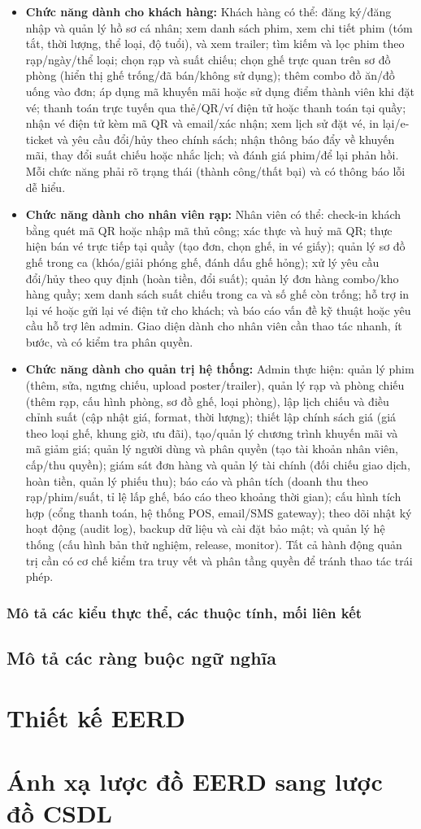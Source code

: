 \documentclass[a4paper]{article}
\begin{document}
\begin{itemize}
	\item \textbf{Chức năng dành cho khách hàng:} Khách hàng có thể: đăng ký/đăng nhập và quản lý hồ sơ cá nhân; xem danh sách phim, xem chi tiết phim (tóm tắt, thời lượng, thể loại, độ tuổi), và xem trailer; tìm kiếm và lọc phim theo rạp/ngày/thể loại; chọn rạp và suất chiếu; chọn ghế trực quan trên sơ đồ phòng (hiển thị ghế trống/đã bán/không sử dụng); thêm combo đồ ăn/đồ uống vào đơn; áp dụng mã khuyến mãi hoặc sử dụng điểm thành viên khi đặt vé; thanh toán trực tuyến qua thẻ/QR/ví điện tử hoặc thanh toán tại quầy; nhận vé điện tử kèm mã QR và email/xác nhận; xem lịch sử đặt vé, in lại/e-ticket và yêu cầu đổi/hủy theo chính sách; nhận thông báo đẩy về khuyến mãi, thay đổi suất chiếu hoặc nhắc lịch; và đánh giá phim/để lại phản hồi. Mỗi chức năng phải rõ trạng thái (thành công/thất bại) và có thông báo lỗi dễ hiểu.
	\item \textbf{Chức năng dành cho nhân viên rạp:} Nhân viên có thể: check-in khách bằng quét mã QR hoặc nhập mã thủ công; xác thực và huỷ mã QR; thực hiện bán vé trực tiếp tại quầy (tạo đơn, chọn ghế, in vé giấy); quản lý sơ đồ ghế trong ca (khóa/giải phóng ghế, đánh dấu ghế hỏng); xử lý yêu cầu đổi/hủy theo quy định (hoàn tiền, đổi suất); quản lý đơn hàng combo/kho hàng quầy; xem danh sách suất chiếu trong ca và số ghế còn trống; hỗ trợ in lại vé hoặc gửi lại vé điện tử cho khách; và báo cáo vấn đề kỹ thuật hoặc yêu cầu hỗ trợ lên admin. Giao diện dành cho nhân viên cần thao tác nhanh, ít bước, và có kiểm tra phân quyền.
	\item \textbf{Chức năng dành cho quản trị hệ thống:} Admin thực hiện: quản lý phim (thêm, sửa, ngưng chiếu, upload poster/trailer), quản lý rạp và phòng chiếu (thêm rạp, cấu hình phòng, sơ đồ ghế, loại phòng), lập lịch chiếu và điều chỉnh suất (cập nhật giá, format, thời lượng); thiết lập chính sách giá (giá theo loại ghế, khung giờ, ưu đãi), tạo/quản lý chương trình khuyến mãi và mã giảm giá; quản lý người dùng và phân quyền (tạo tài khoản nhân viên, cấp/thu quyền); giám sát đơn hàng và quản lý tài chính (đối chiếu giao dịch, hoàn tiền, quản lý phiếu thu); báo cáo và phân tích (doanh thu theo rạp/phim/suất, tỉ lệ lấp ghế, báo cáo theo khoảng thời gian); cấu hình tích hợp (cổng thanh toán, hệ thống POS, email/SMS gateway); theo dõi nhật ký hoạt động (audit log), backup dữ liệu và cài đặt bảo mật; và quản lý hệ thống (cấu hình bản thử nghiệm, release, monitor). Tất cả hành động quản trị cần có cơ chế kiểm tra truy vết và phân tầng quyền để tránh thao tác trái phép.
\end{itemize}

\subsubsection{Mô tả các kiểu thực thể, các thuộc tính, mối liên kết}
\subsection{Mô tả các ràng buộc ngữ nghĩa}
\section{Thiết kế EERD}
\section{Ánh xạ lược đồ EERD sang lược đồ CSDL}
\end{document}
